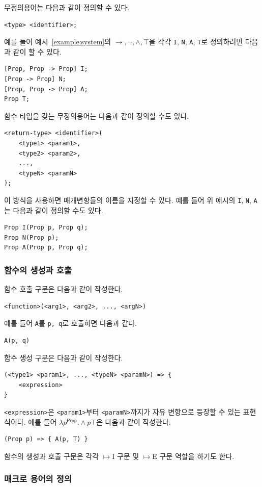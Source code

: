 \documentclass[10pt,twocolumn]{article}
\theoremstyle{definition}
\newcommand{\Prop}{\mathsf{Prop}}
\begin{document}
무정의용어는 다음과 같이 정의할 수 있다.
\begin{lstlisting}
<type> <identifier>;
\end{lstlisting}
예를 들어 예시~\ref{example:system}의 $\to, \neg, \land, \top$을 각각 \verb!I!, \verb!N!, \verb!A!, \verb!T!로 정의하려면 다음과 같이 할 수 있다.
\begin{lstlisting}
[Prop, Prop -> Prop] I;
[Prop -> Prop] N;
[Prop, Prop -> Prop] A;
Prop T;
\end{lstlisting}

함수 타입을 갖는 무정의용어는 다음과 같이 정의할 수도 있다.
\begin{lstlisting}
<return-type> <identifier>(
	<type1> <param1>,
	<type2> <param2>,
	...,
	<typeN> <paramN>
);
\end{lstlisting}
이 방식을 사용하면 매개변항들의 이름을 지정할 수 있다. 예를 들어 위 예시의 \verb!I!, \verb!N!, \verb!A!는 다음과 같이 정의할 수도 있다.
\begin{lstlisting}
Prop I(Prop p, Prop q);
Prop N(Prop p);
Prop A(Prop p, Prop q);
\end{lstlisting}

\subsubsection{함수의 생성과 호출}

함수 호출 구문은 다음과 같이 작성한다.
\begin{lstlisting}
<function>(<arg1>, <arg2>, ..., <argN>)
\end{lstlisting}
예를 들어 \verb!A!를 \verb!p, q!로 호출하면 다음과 같다.
\begin{lstlisting}
A(p, q)
\end{lstlisting}

함수 생성 구문은 다음과 같이 작성한다.
\begin{lstlisting}
(<type1> <param1>, ..., <typeN> <paramN>) => {
	<expression>
}
\end{lstlisting}
\verb!<expression>!은 \verb!<param1>!부터 \verb!<paramN>!까지가 자유 변항으로 등장할 수 있는 표현식이다. 예를 들어 $\lambda p^\Prop.\land p\top$은 다음과 같이 작성한다.
\begin{lstlisting}
(Prop p) => { A(p, T) }
\end{lstlisting}

함수의 생성과 호출 구문은 각각 $\mapsto$I 구문 및 $\mapsto$E 구문 역할을 하기도 한다.

\subsubsection{매크로 용어의 정의}
\end{document}
